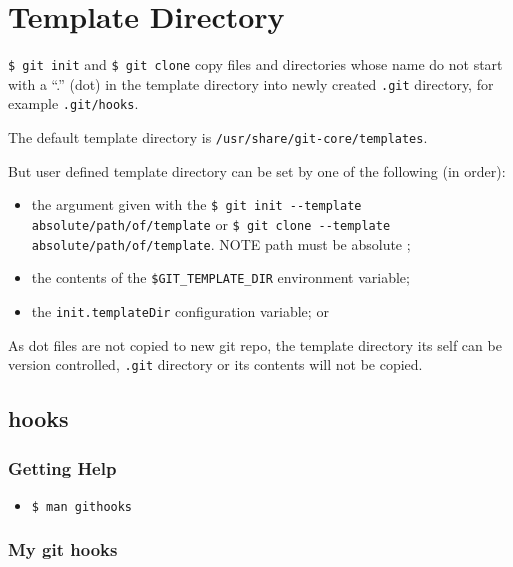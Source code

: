\section{Template Directory}%
\label{sec:template_directory}

\texttt{\$ git init} and \texttt{\$ git clone} copy files and directories whose name do not start with a ``.'' (dot) in the template directory into newly created \texttt{.git} directory, for example \texttt{.git/hooks}.

The default template directory is \texttt{/usr/share/git-core/templates}.

But user defined template directory can be set by one of the following (in order):
\begin{itemize}
  \item the argument given with the \texttt{\$ git init -{}-template absolute/path/of/template} or \texttt{\$ git clone -{}-template absolute/path/of/template}. NOTE path must be absolute ;
  \item the contents of the \texttt{\$GIT\_TEMPLATE\_DIR} environment variable;
  \item the \texttt{init.templateDir} configuration variable; or
\end{itemize}


As dot files are not copied to new git repo, the template directory its self can be version controlled, \texttt{.git} directory or its contents will not be copied.


\subsection{hooks}
\subsubsection{Getting Help}%
\begin{itemize}
  \item \texttt{\$ man githooks}
\end{itemize}

\subsubsection{My git hooks}%



